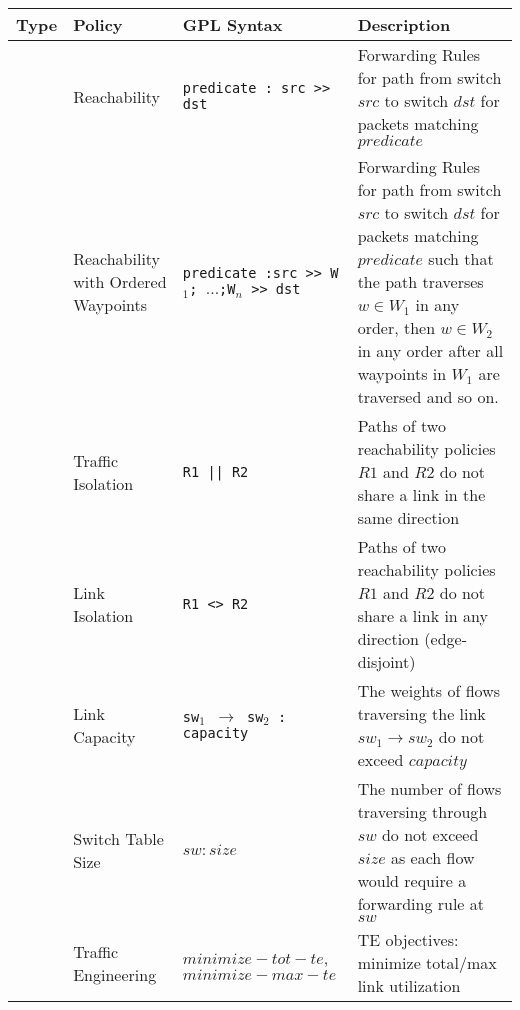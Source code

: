 \begin{table*}[thb]
\begin{small}
	\begin{center}
		\begin{tabular}{m{5em} | m{6em} | m{11em} | m{34em} } 
			Type & Policy &  GPL Syntax & Description \\ 
			\hline
			& Reachability & 	\texttt{predicate : src >> dst} & Forwarding Rules for path from switch $src$ to switch $dst$ for packets matching $predicate$ \\
			\hhline{~---}
			\multirow{3}{*}{Tenant} & Reachability with Ordered Waypoints & \texttt{predicate :\newline src >> W$_1$; $\ldots$;W$_n$ >> dst} & Forwarding Rules for path from switch $src$ to switch $dst$ for packets matching $predicate$ such that the path traverses $w \in W_1$ in any order, then $w \in W_2$ in any order after all waypoints in $W_1$ are traversed and so on.\\  
			\hhline{~---}
			& Traffic \newline Isolation & \texttt{R1 || R2} & Paths of two reachability policies $R1$ and $R2$ do not share a link in the same direction \\
			\hhline{~---}
			& Link \newline Isolation & \texttt{R1 <> R2} & Paths of two reachability policies $R1$ and $R2$ do not share a link in any direction (edge-disjoint) \\
			\hhline{----}
			& Link \newline Capacity & \texttt{sw$_1$ $\rightarrow$ sw$_2$ : capacity}  & The weights of flows traversing the link $sw_1 \rightarrow sw_2$ do not exceed $capacity$\\
			\hhline{~---}
			\multirow{2}{*}{Operator} & Switch \newline Table Size & $sw : size$ & The number of flows traversing through $sw$ do not exceed $size$ as each flow would require a forwarding rule at $sw$ \\
			\hhline{~---}
			& Traffic \newline Engineering & $minimize-tot-te$,\newline $minimize-max-te$ & TE objectives: minimize total/max link utilization \\
		\end{tabular}
	\end{center}
	 \label{tab:policysupport} 
\end{small}
\end{table*}


